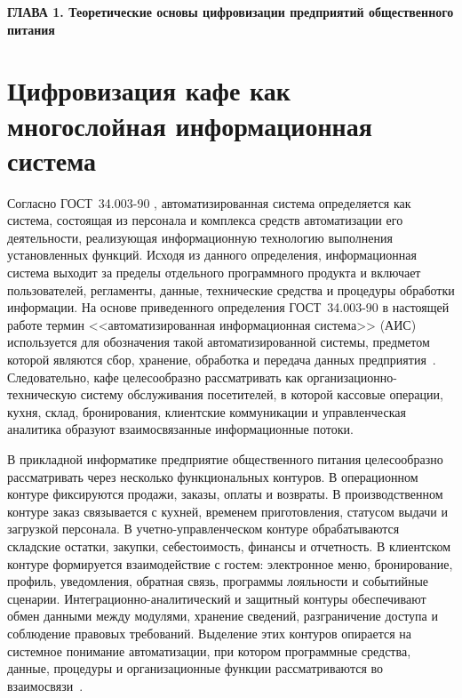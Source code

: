 \newpage
\begin{center}
  \textbf{\large ГЛАВА 1. Теоретические основы цифровизации предприятий общественного питания}
\end{center}

\section{Цифровизация кафе как многослойная информационная система}

Согласно ГОСТ~34.003-90 \cite{gost34003}, автоматизированная система определяется как система, состоящая из персонала и комплекса средств автоматизации его деятельности, реализующая информационную технологию выполнения установленных функций. Исходя из данного определения, информационная система выходит за пределы отдельного программного продукта и включает пользователей, регламенты, данные, технические средства и процедуры обработки информации. На основе приведенного определения ГОСТ~34.003-90 в настоящей работе термин <<автоматизированная информационная система>> (АИС) используется для обозначения такой автоматизированной системы, предметом которой являются сбор, хранение, обработка и передача данных предприятия~\cite{gost34003}. Следовательно, кафе целесообразно рассматривать как организационно-техническую систему обслуживания посетителей, в которой кассовые операции, кухня, склад, бронирования, клиентские коммуникации и управленческая аналитика образуют взаимосвязанные информационные потоки.

В прикладной информатике предприятие общественного питания целесообразно рассматривать через несколько функциональных контуров. В операционном контуре фиксируются продажи, заказы, оплаты и возвраты. В производственном контуре заказ связывается с кухней, временем приготовления, статусом выдачи и загрузкой персонала. В учетно-управленческом контуре обрабатываются складские остатки, закупки, себестоимость, финансы и отчетность. В клиентском контуре формируется взаимодействие с гостем: электронное меню, бронирование, профиль, уведомления, обратная связь, программы лояльности и событийные сценарии. Интеграционно-аналитический и защитный контуры обеспечивают обмен данными между модулями, хранение сведений, разграничение доступа и соблюдение правовых требований. Выделение этих контуров опирается на системное понимание автоматизации, при котором программные средства, данные, процедуры и организационные функции рассматриваются во взаимосвязи~\cite{utkin_baldin_2003, kandalenkova2023}.

